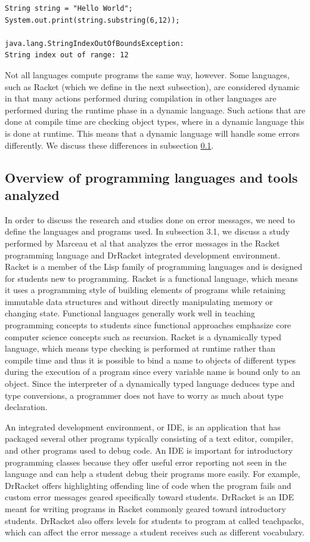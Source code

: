 \documentclass{sig-alternate}
\begin{document}
\begin{verbatim}
String string = "Hello World";
System.out.print(string.substring(6,12));

java.lang.StringIndexOutOfBoundsException:
String index out of range: 12
\end{verbatim}

Not all languages compute programs the same way, however.
Some languages, such as Racket (which we define in the next subsection), are considered dynamic in that many actions performed during compilation in other languages are performed during the runtime phase in a dynamic language.
Such actions that are done at compile time are checking object types, where in a dynamic language this is done at runtime.
This means that a dynamic language will handle some errors differently.
We discuss these differences in subsection \ref{subsec:languages}.


\subsection{Overview of programming languages and tools analyzed}\label{subsec:languages}

In order to discuss the research and studies done on error messages, we need to define the languages and programs used.
In subsection 3.1, we discuss a study performed by Marceau et al that analyzes the error messages in the Racket programming language and DrRacket integrated development environment.
Racket is a member of the Lisp family of programming languages and is designed for students new to programming.
Racket is a functional language, which means it uses a programming style of building elements of programs while retaining immutable data structures 
and without directly manipulating memory or changing state.
Functional languages generally work well in teaching programming concepts to students since functional approaches emphasize core computer science concepts such as recursion.
Racket is a dynamically typed language, which means type checking is performed at runtime rather than compile time and thus it is possible to bind a name to objects of different types during the execution of a program since every variable name is bound only to an object.
Since the interpreter of a dynamically typed language deduces type and type conversions, a programmer does not have to worry as much about type declaration.

An integrated development environment, or IDE, is an application that has packaged several other programs typically consisting of a text editor, compiler, and other programs used to debug code.
An IDE is important for introductory programming classes because they offer useful error reporting not seen in the language and can help a student debug their programs more easily.
For example, DrRacket offers highlighting offending line of code when the program fails and custom error messages geared specifically toward students.
DrRacket is an IDE meant for writing programs in Racket commonly geared toward introductory students.
DrRacket also offers levels for students to program at called teachpacks, which can affect the error message a student receives such as different vocabulary.
\end{document}
